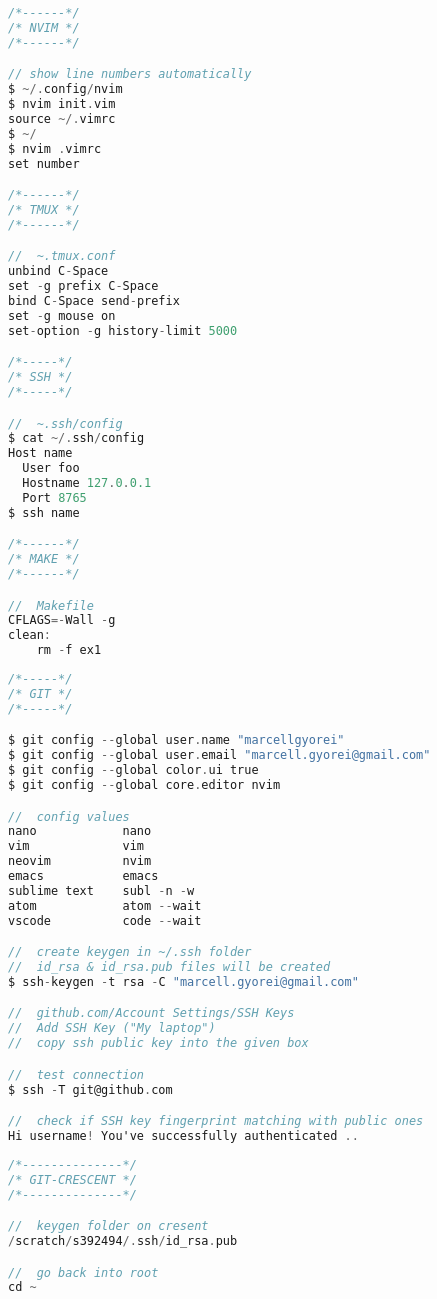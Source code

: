 \documentclass[8pt]{extarticle}
\begin{document}
\begin{small}
\begin{multicols}{2}
\begin{lstlisting}[language=C]
/*------*/
/* NVIM */
/*------*/

// show line numbers automatically
$ ~/.config/nvim
$ nvim init.vim
source ~/.vimrc
$ ~/
$ nvim .vimrc
set number

/*------*/
/* TMUX */
/*------*/

//  ~.tmux.conf
unbind C-Space
set -g prefix C-Space
bind C-Space send-prefix
set -g mouse on
set-option -g history-limit 5000

/*-----*/
/* SSH */
/*-----*/

//  ~.ssh/config
$ cat ~/.ssh/config
Host name
  User foo
  Hostname 127.0.0.1
  Port 8765
$ ssh name

/*------*/
/* MAKE */
/*------*/

//  Makefile
CFLAGS=-Wall -g
clean:
	rm -f ex1

\end{lstlisting}

\begin{lstlisting}[language=C]
/*-----*/
/* GIT */
/*-----*/

$ git config --global user.name "marcellgyorei"
$ git config --global user.email "marcell.gyorei@gmail.com"
$ git config --global color.ui true
$ git config --global core.editor nvim

//  config values
nano			nano
vim				vim
neovim			nvim
emacs			emacs
sublime text	subl -n -w
atom			atom --wait
vscode			code --wait

//  create keygen in ~/.ssh folder
//  id_rsa & id_rsa.pub files will be created
$ ssh-keygen -t rsa -C "marcell.gyorei@gmail.com"

//  github.com/Account Settings/SSH Keys
//  Add SSH Key ("My laptop")
//  copy ssh public key into the given box

//  test connection
$ ssh -T git@github.com

//  check if SSH key fingerprint matching with public ones
Hi username! You've successfully authenticated ..
\end{lstlisting}

\begin{lstlisting}[language=C]
/*--------------*/
/* GIT-CRESCENT */
/*--------------*/

//  keygen folder on cresent
/scratch/s392494/.ssh/id_rsa.pub

//  go back into root
cd ~


\end{lstlisting}

\vfill\null
\columnbreak
\vfill\null

\end{multicols}
\end{small}
\end{document}
